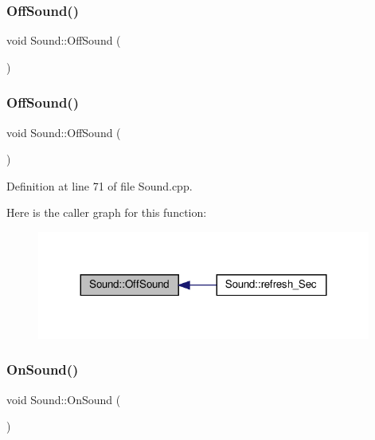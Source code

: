 \subsubsection{\texorpdfstring{Off\+Sound()}{OffSound()}\hspace{0.1cm}{\footnotesize\ttfamily [1/2]}}
{\footnotesize\ttfamily void Sound\+::\+Off\+Sound (\begin{DoxyParamCaption}{ }\end{DoxyParamCaption})\hspace{0.3cm}{\ttfamily [protected]}}

\mbox{\label{class_sound_ab1fb7a2e72d848ca335b4721cd8540b7}} 
\subsubsection{\texorpdfstring{Off\+Sound()}{OffSound()}\hspace{0.1cm}{\footnotesize\ttfamily [2/2]}}
{\footnotesize\ttfamily void Sound\+::\+Off\+Sound (\begin{DoxyParamCaption}{ }\end{DoxyParamCaption})\hspace{0.3cm}{\ttfamily [protected]}}



Definition at line 71 of file Sound.\+cpp.

Here is the caller graph for this function\+:
\nopagebreak
\begin{figure}[H]
\begin{center}
\leavevmode
\includegraphics[width=311pt]{class_sound_ab1fb7a2e72d848ca335b4721cd8540b7_icgraph}
\end{center}
\end{figure}
\mbox{\label{class_sound_ac26eda99f623e5a839d1c408d8a591d9}} 
\subsubsection{\texorpdfstring{On\+Sound()}{OnSound()}\hspace{0.1cm}{\footnotesize\ttfamily [1/2]}}
{\footnotesize\ttfamily void Sound\+::\+On\+Sound (\begin{DoxyParamCaption}{ }\end{DoxyParamCaption})\hspace{0.3cm}{\ttfamily [protected]}}



